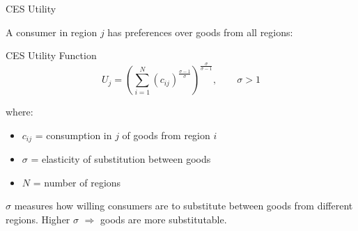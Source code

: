 \documentclass{beamer}
\begin{document}
\begin{frame}{CES Utility}

    A consumer in region $j$ has preferences over goods from all regions:

    \vspace{0.3em}
    \begin{block}{CES Utility Function}
        \vspace{-0.5em}
        \[ U_j = \left( \sum_{i=1}^{N} \left( c_{ij} \right)^{\frac{\sigma-1}{\sigma}} \right)^{\frac{\sigma}{\sigma-1}}, \qquad \sigma > 1 \]
    \end{block}

    \vspace{0.3em}
    where:
    \begin{itemize}
        \item $c_{ij}$ = consumption in $j$ of goods from region $i$
        \item $\sigma$ = elasticity of substitution between goods
        \item $N$ = number of regions
    \end{itemize}

    \vspace{0.3em}
     $\sigma$ measures how willing consumers are to substitute between goods from different regions. Higher $\sigma$ $\Rightarrow$ goods are more substitutable.

\end{frame}
\end{document}
